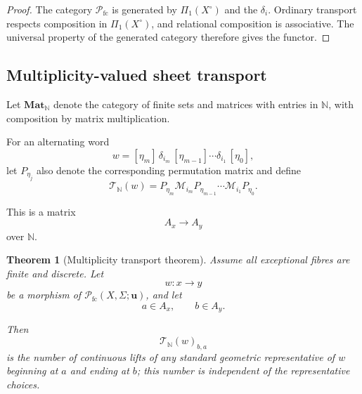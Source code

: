 \documentclass[11pt]{article}
\theoremstyle{plain}
\newtheorem{theorem}{Theorem}[section]
\theoremstyle{definition}
\begin{document}
\begin{proof}
The category $\mathcal P_{\mathrm{fc}}$ is generated by $\Pi_1(X^\circ)$ and the
$\delta_i$.  Ordinary transport respects composition in $\Pi_1(X^\circ)$, and
relational composition is associative.  The universal property of the generated category
therefore gives the functor.
\end{proof}

\subsection{Multiplicity-valued sheet transport}
\label{subsec:word-multiplicity}

Let $\mathbf{Mat}_{\mathbb N}$ denote the category of finite sets and matrices with entries in $\mathbb N$, with composition by matrix multiplication.

For an alternating word
\[
w=[\eta_m]\,\delta_{i_m}\,[\eta_{m-1}]\cdots\delta_{i_1}\,[\eta_0],
\]
let $P_{\eta_j}$ also denote the corresponding permutation matrix and define
\[
\mathscr T_{\mathbb N}(w)=P_{\eta_m}\mathcal M_{i_m}P_{\eta_{m-1}}\cdots\mathcal M_{i_1}P_{\eta_0}.
\]

This is a matrix
\[
A_x\longrightarrow A_y
\]
over $\mathbb N$.


\begin{theorem}[Multiplicity transport theorem]
\label{thm:multiplicity-transport}
Assume all exceptional fibres are finite and discrete.  Let
\[
w:x\to y
\]
be a morphism of $\mathcal P_{\mathrm{fc}}(X,\Sigma;\mathbf u)$, and let
\[
a\in A_x,
\qquad
b\in A_y.
\]

Then
\[
\mathscr T_{\mathbb N}(w)_{b,a}
\]
is the number of continuous lifts of any standard geometric representative of $w$
beginning at $a$ and ending at $b$; this number is independent of the representative choices.
\end{theorem}
\end{document}
